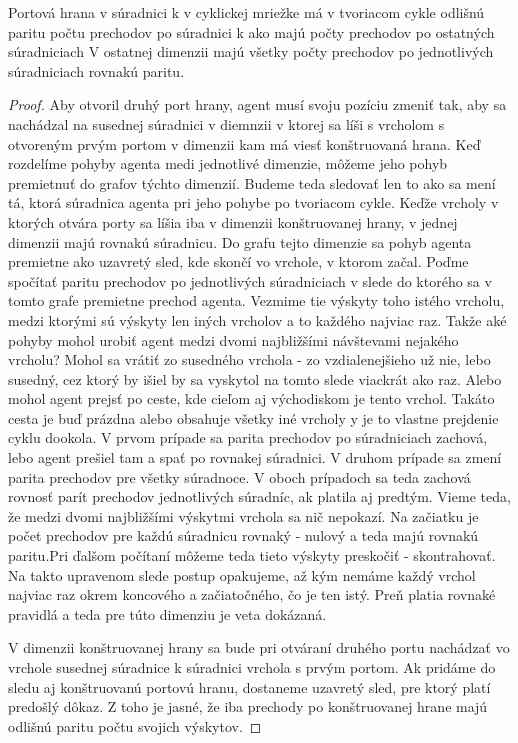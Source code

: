 \begin{lem}
Portová hrana v súradnici k v cyklickej mriežke má v tvoriacom cykle 
odlišnú paritu počtu prechodov po súradnici k ako majú počty prechodov 
po ostatných súradniciach
V ostatnej dimenzii majú všetky počty prechodov po jednotlivých súradniciach
rovnakú paritu.
\end{lem}
\begin{proof}
Aby otvoril druhý port hrany, agent musí svoju pozíciu zmeniť tak, 
aby sa nachádzal na susednej súradnici v diemnzii v ktorej sa líši s
vrcholom s otvoreným prvým portom v dimenzii kam má viesť konštruovaná hrana.
Keď rozdelíme pohyby agenta medi jednotlivé dimenzie, môžeme jeho pohyb
premietnuť do grafov týchto dimenzií. Budeme teda sledovať len to ako sa
mení tá, ktorá súradnica agenta pri jeho pohybe po tvoriacom cykle.
Keďže vrcholy v ktorých otvára porty sa líšia iba v dimenzii konštruovanej
hrany, v jednej dimenzii majú rovnakú súradnicu. Do grafu tejto dimenzie sa
pohyb agenta premietne ako uzavretý sled, kde skončí vo vrchole, v ktorom
začal.
Poďme spočítať paritu prechodov po jednotlivých súradniciach v slede do
ktorého sa v tomto grafe premietne prechod agenta.  Vezmime tie výskyty toho
istého vrcholu, medzi ktorými sú výskyty len iných vrcholov a to každého 
najviac raz. Takže aké pohyby mohol urobiť agent medzi dvomi najbližšími
návštevami nejakého vrcholu? Mohol sa vrátiť zo susedného vrchola - zo
vzdialenejšieho už nie, lebo susedný, cez ktorý by išiel by sa vyskytol na
tomto slede viackrát ako raz. 
Alebo mohol agent prejsť po ceste, kde cieľom
aj východiskom je tento vrchol. Takáto cesta je buď prázdna alebo obsahuje
všetky iné vrcholy y je to vlastne prejdenie cyklu dookola.
V prvom prípade sa parita prechodov po súradniciach zachová, lebo agent
prešiel tam a spať po rovnakej súradnici. V druhom prípade sa zmení parita
prechodov pre všetky súradnoce. V oboch prípadoch sa teda zachová rovnosť
parít prechodov jednotlivých súradníc, ak platila aj predtým. 
Vieme teda, že medzi dvomi najbližšími výskytmi vrchola sa nič nepokazí. Na
začiatku je počet prechodov pre každú súradnicu rovnaký - nulový a teda majú
rovnakú paritu.Pri ďalšom počítaní môžeme teda tieto výskyty preskočiť -
skontrahovať. Na takto upravenom slede postup opakujeme, až kým nemáme každý
vrchol najviac raz okrem koncového a začiatočného, čo je ten istý. Preň
platia rovnaké pravidlá a teda pre túto dimenziu je veta dokázaná.

V dimenzii konštruovanej hrany sa bude pri otváraní druhého portu nachádzať
vo vrchole susednej súradnice k súradnici vrchola s prvým portom.
Ak pridáme do sledu aj konštruovanú portovú hranu, dostaneme uzavretý sled, pre ktorý
platí predošlý dôkaz. Z toho je jasné, že iba prechody po konštruovanej
hrane majú odlišnú paritu počtu svojich výskytov.
\end{proof}


